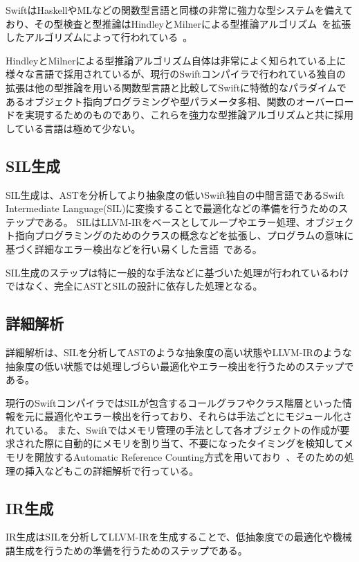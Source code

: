 SwiftはHaskellやMLなどの関数型言語と同様の非常に強力な型システムを備えており、その型検査と型推論はHindleyとMilnerによる型推論アルゴリズム~\cite{tapl}を拡張したアルゴリズムによって行われている~\cite{swift-type-checker}。

HindleyとMilnerによる型推論アルゴリズム自体は非常によく知られている上に様々な言語で採用されているが、現行のSwiftコンパイラで行われている独自の拡張は他の型推論を用いる関数型言語と比較してSwiftに特徴的なパラダイムであるオブジェクト指向プログラミングや型パラメータ多相、関数のオーバーロードを実現するためのものであり、これらを強力な型推論アルゴリズムと共に採用している言語は極めて少ない。

\subsection{SIL生成}

SIL生成は、ASTを分析してより抽象度の低いSwift独自の中間言語であるSwift Intermediate Language(SIL)に変換することで最適化などの準備を行うためのステップである。
SILはLLVM-IRをベースとしてループやエラー処理、オブジェクト指向プログラミングのためのクラスの概念などを拡張し、プログラムの意味に基づく詳細なエラー検出などを行い易くした言語~\cite{sil}である。

SIL生成のステップは特に一般的な手法などに基づいた処理が行われているわけではなく、完全にASTとSILの設計に依存した処理となる。

\subsection{詳細解析}
\label{refinement:structure:analyze}

詳細解析は、SILを分析してASTのような抽象度の高い状態やLLVM-IRのような抽象度の低い状態では処理しづらい最適化やエラー検出を行うためのステップである。

現行のSwiftコンパイラではSILが包含するコールグラフやクラス階層といった情報を元に最適化やエラー検出を行っており、それらは手法ごとにモジュール化されている。
また、Swiftではメモリ管理の手法として各オブジェクトの作成が要求された際に自動的にメモリを割り当て、不要になったタイミングを検知してメモリを開放するAutomatic Reference Counting方式を用いており~\cite{arc}、そのための処理の挿入などもこの詳細解析で行っている。

\subsection{IR生成}

IR生成はSILを分析してLLVM-IRを生成することで、低抽象度での最適化や機械語生成を行うための準備を行うためのステップである。

